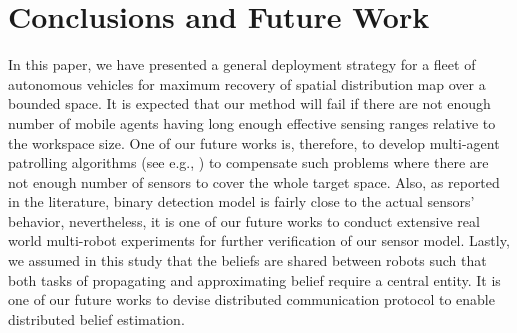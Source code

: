 \documentclass[journal]{IEEEtran}
\begin{document}
\section{Conclusions and Future Work}
\label{sec:sec9}
In this paper, we have presented a general deployment strategy for a fleet of autonomous vehicles for maximum recovery of spatial distribution map over a bounded space. It is expected that our method will fail if there are not enough number of mobile agents having long enough effective sensing ranges relative to the workspace size. One of our future works is, therefore, to develop multi-agent patrolling algorithms (see e.g., \cite{portugal2011survey}) to compensate such problems where there are not enough number of sensors to cover the whole target space.
Also, as reported in the literature, binary detection model is fairly close to the actual sensors' behavior, nevertheless, it is one of our future works to conduct extensive real world multi-robot experiments for further verification of our sensor model.
Lastly, we assumed in this study that the beliefs are shared between robots such that both tasks of propagating and approximating belief require a central entity. It is one of our future works to devise distributed communication protocol to enable distributed belief estimation. 




\end{document}
